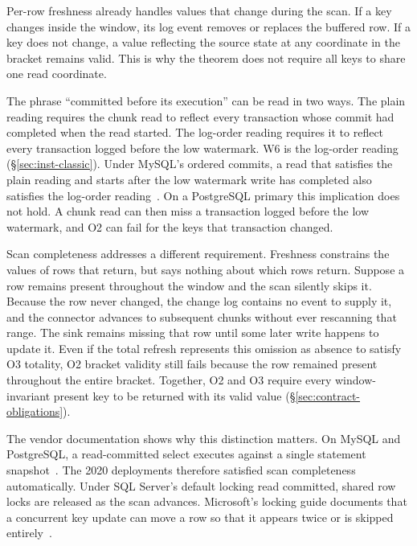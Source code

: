 \documentclass[sigconf,nonacm,10pt]{acmart}
\theoremstyle{plain}
\theoremstyle{definition}
\begin{document}
Per-row freshness already handles values that change during the scan. If a key 
changes inside the window, its log event removes or replaces the buffered row. 
If a key does not change, a value reflecting the source state at any coordinate 
in the bracket remains valid. This is why the theorem does not require all keys 
to share one read coordinate.

The phrase ``committed before its execution'' can be read in two ways.
The plain reading requires the chunk read to reflect
every transaction whose commit had completed when the read started. The log-order
reading requires it to reflect every transaction logged before the low
watermark. W6 is the log-order reading
(\S\ref{sec:inst-classic}). Under MySQL's ordered commits, a read that
satisfies the plain reading and starts after the low watermark write has
completed also satisfies the log-order
reading~\cite{mysql_binlog_options,mysql_consistent_read}. On a PostgreSQL
primary this implication does not hold. A chunk read can then miss a
transaction logged before the low watermark, and O2 can fail for the keys
that transaction changed.

Scan completeness addresses a different requirement. Freshness constrains the 
values of rows that return, but says nothing about which rows return. Suppose a 
row remains present throughout the window and the scan silently skips it. Because 
the row never changed, the change log contains no event to supply it, and the connector 
advances to subsequent chunks without ever rescanning that range. The sink remains 
missing that row until some later write happens to update it. Even if the total refresh represents this omission as
absence to satisfy O3 totality, O2 bracket validity still fails because the
row remained present throughout the entire bracket. Together, O2 and O3
require every window-invariant present key to be returned with its valid value
(\S\ref{sec:contract-obligations}).

The vendor documentation shows why this distinction matters. On MySQL and 
PostgreSQL, a read-committed select executes against a single statement 
snapshot~\cite{mysql_consistent_read,postgres_transaction_iso}. The 2020 
deployments therefore satisfied scan completeness automatically. Under
SQL Server's default locking read committed, shared row locks are released as 
the scan advances. Microsoft's locking guide documents that a concurrent key 
update can move a row so that it appears twice or is skipped 
entirely~\cite{mssql_locking_guide}.
\end{document}
